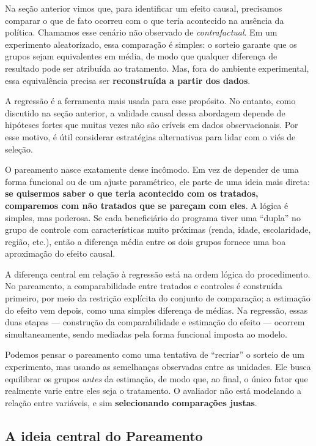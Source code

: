 Na seção anterior vimos que, para identificar um efeito causal, precisamos comparar o que de fato ocorreu com o que teria acontecido na ausência da política. Chamamos esse cenário não observado de \emph{contrafactual}. Em um experimento aleatorizado, essa comparação é simples: o sorteio garante que os grupos sejam equivalentes em média, de modo que qualquer diferença de resultado pode ser atribuída ao tratamento. Mas, fora do ambiente experimental, essa equivalência precisa ser \textbf{reconstruída a partir dos dados}.

A regressão é a ferramenta mais usada para esse propósito. No entanto, como discutido na seção anterior, a validade causal dessa abordagem depende de hipóteses fortes que muitas vezes não são críveis em dados observacionais. Por esse motivo, é útil considerar estratégias alternativas para lidar com o viés de seleção.

O pareamento nasce exatamente desse incômodo. Em vez de depender de uma forma funcional ou de um ajuste paramétrico, ele parte de uma ideia mais direta: \textbf{se quisermos saber o que teria acontecido com os tratados, comparemos com não tratados que se pareçam com eles}. A lógica é simples, mas poderosa. Se cada beneficiário do programa tiver uma ``dupla'' no grupo de controle com características muito próximas (renda, idade, escolaridade, região, etc.), então a diferença média entre os dois grupos fornece uma boa aproximação do efeito causal.

A diferença central em relação à regressão está na ordem lógica do procedimento. No pareamento, a comparabilidade entre tratados e controles é construída primeiro, por meio da restrição explícita do conjunto de comparação; a estimação do efeito vem depois, como uma simples diferença de médias. Na regressão, essas duas etapas --- construção da comparabilidade e estimação do efeito --- ocorrem simultaneamente, sendo mediadas pela forma funcional imposta ao modelo.


Podemos pensar o pareamento como uma tentativa de “recriar” o sorteio de um experimento, mas usando as semelhanças observadas entre as unidades. Ele busca equilibrar os grupos \emph{antes} da estimação, de modo que, ao final, o único fator que realmente varie entre eles seja o tratamento. O avaliador não está modelando a relação entre variáveis, e sim \textbf{selecionando comparações justas}.

\subsection{A ideia central do Pareamento}

